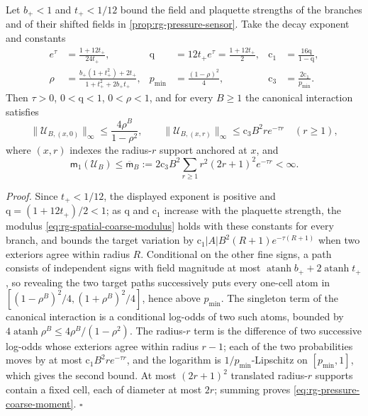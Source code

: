 Let $b_+<1$ and $t_+<1/12$ bound the field and plaquette strengths of the
branches and of their shifted fields in \cref{prop:rg-pressure-sensor}. Take
the decay exponent and constants
\begin{align}
 e^{\tau}&=\frac{1+12t_+}{24t_+},&
 \mathrm q&=12t_+e^\tau=\frac{1+12t_+}{2},& \mathrm c_1&=\frac{16\mathrm q}{1-\mathrm q},
 \label{eq:rg-pressure-locality-constants}\\
 \rho&=\frac{b_+(1+t_+^2)+2t_+}{1+t_+^2+2b_+t_+},&
 p_{\min}&=\frac{(1-\rho)^2}{4},&\mathrm c_3&=\frac{2\mathrm c_1}{p_{\min}}.
 \label{eq:rg-pressure-positive-constants}
\end{align}
Then $\tau>0$, $0<\mathrm q<1$, $0<\rho<1$, and for every $B\geq1$ the canonical
interaction satisfies
\begin{equation}
 \|\mathscr U_{B,(x,0)}\|_\infty\leq\frac{4\rho^B}{1-\rho^2},\qquad
 \|\mathscr U_{B,(x,r)}\|_\infty\leq \mathrm c_3B^2re^{-\tau r}\quad(r\geq1),
 \label{eq:rg-pressure-shell}
\end{equation}
where $(x,r)$ indexes the radius-$r$ support anchored at $x$, and
\begin{equation}
 \mathsf m_1(\mathscr U_B)\leq\overline{\mathsf m}_B
 :=2\mathrm c_3B^2\sum_{r\geq1}r^2(2r+1)^2e^{-\tau r}<\infty.
 \label{eq:rg-pressure-coarse-moment}
\end{equation}

\noindent\emph{Proof.}
Since $t_+<1/12$, the displayed exponent is positive and
$\mathrm q=(1+12t_+)/2<1$; as $\mathrm q$ and $\mathrm c_1$ increase with the plaquette strength, the
modulus \cref{eq:rg-spatial-coarse-modulus} holds with these constants for
every branch, and bounds the target variation by
$\mathrm c_1|A|B^2(R+1)e^{-\tau(R+1)}$ when two exteriors agree within radius $R$.
Conditional on the other fine signs, a path consists of independent signs
with field magnitude at most $\operatorname{atanh}b_++2\operatorname{atanh}t_+$,
so revealing the two target paths successively puts every one-cell atom in
$[(1-\rho^B)^2/4,(1+\rho^B)^2/4]$, hence above $p_{\min}$. The singleton
term of the canonical interaction is a conditional log-odds of two such atoms,
bounded by $4\operatorname{atanh}\rho^B\leq4\rho^B/(1-\rho^2)$. The radius-$r$
term is the difference of two successive log-odds whose exteriors agree
within radius $r-1$; each of the two probabilities moves by at most
$\mathrm c_1B^2re^{-\tau r}$, and the logarithm is $1/p_{\min}$-Lipschitz on
$[p_{\min},1]$, which gives the second bound. At most $(2r+1)^2$
translated radius-$r$ supports contain a fixed cell, each of diameter at most
$2r$; summing proves \cref{eq:rg-pressure-coarse-moment}. $\square$

